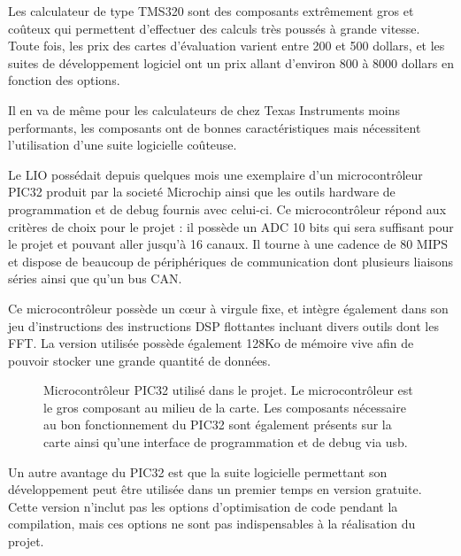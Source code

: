 \documentclass[letterpaper, twoside, 12pt, memoire, creativecommons, hyperref]{thETS}
\begin{document}
Les calculateur de type TMS320 sont des composants extrêmement gros et coûteux qui permettent d'effectuer des calculs très poussés à grande vitesse.  Toute fois, les prix des cartes d'évaluation varient entre 200 et 500 dollars, et les suites de développement logiciel ont un prix allant d'environ 800 à 8000 dollars en fonction des options. 

Il en va de même pour les calculateurs de chez Texas Instruments moins performants, les composants ont de bonnes caractéristiques mais nécessitent l'utilisation d'une suite logicielle coûteuse. 

Le LIO possédait depuis quelques mois une exemplaire d'un microcontrôleur PIC32 produit par la societé Microchip ainsi que les outils hardware de programmation et de debug fournis avec celui-ci. Ce microcontrôleur répond aux critères de choix pour le projet : il possède un ADC 10 bits qui sera suffisant pour le projet et pouvant aller jusqu’à 16 canaux. Il tourne à une cadence de 80 MIPS et dispose de beaucoup de périphériques de communication dont plusieurs liaisons séries ainsi que qu’un bus CAN. 

Ce microcontrôleur possède un cœur à virgule fixe, et intègre également dans son jeu d'instructions des instructions DSP flottantes incluant divers outils dont les FFT. La version utilisée possède également 128Ko de mémoire vive afin de pouvoir stocker une grande quantité de données.

\begin{figure}
	\centering
	\caption{Microcontrôleur PIC32 utilisé dans le projet. Le microcontrôleur est le gros composant au milieu de la carte. Les composants nécessaire au bon fonctionnement du PIC32 sont également présents sur la carte ainsi qu'une interface de programmation et de debug via usb.}
	\label{fig:inverseur}
\end{figure}


Un autre avantage du PIC32 est que la suite logicielle permettant son développement peut être utilisée dans un premier temps en version gratuite. Cette version n'inclut pas les options d'optimisation de code pendant la compilation, mais ces options ne sont pas indispensables à la réalisation du projet. 
\end{document}
